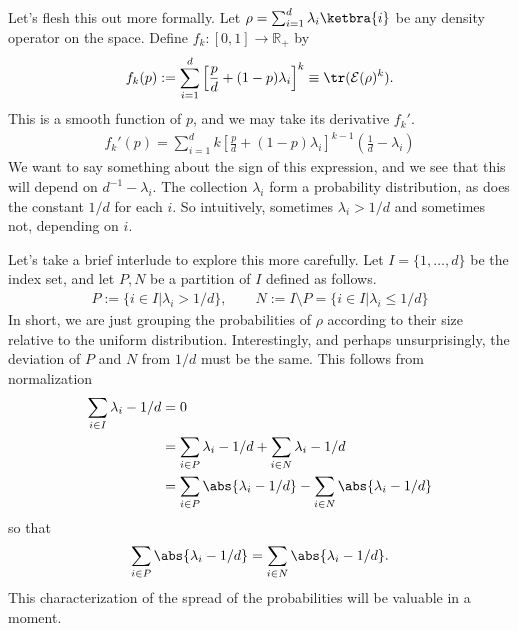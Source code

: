 \documentclass{book}
\begin{document}
    Let's flesh this out more formally. Let $\rho = \sum_{i=1}^d \lambda_i \ketbra{i}$ be any density operator on the space. Define $f_k:[0,1] \rightarrow \mathbb{R}_+$ by
    \begin{align}
        f_k(p) := \sum_{i=1}^d \left[\frac{p}{d} + (1-p) \lambda_i\right]^k \equiv \tr(\mathcal{E}(\rho)^k).
    \end{align}
    This is a smooth function of $p$, and we may take its derivative $f_k'$.
    \begin{align}\label{eq:8.18_deriv}
        f_k'(p) = \sum_{i=1}^d k \left[\frac{p}{d} + (1-p) \lambda_i\right]^{k-1} \left(\frac1d - \lambda_i\right)
    \end{align}
    We want to say something about the sign of this expression, and we see that this will depend on $d^{-1} - \lambda_i$. The collection $\lambda_i$ form a probability distribution, as does the constant $1/d$ for each $i$. So intuitively, sometimes $\lambda_i > 1/d$ and sometimes not, depending on $i$. 

    Let's take a brief interlude to explore this more carefully. Let $I = \{1, \dots, d\}$ be the index set, and let $P, N$ be a partition of $I$ defined as follows.
    \begin{align}
        P := \{i \in I \vert \lambda_i > 1/d\}, \qquad N := I \setminus P = \{i \in I \vert \lambda_i \leq 1/d\}
    \end{align}
    In short, we are just grouping the probabilities of $\rho$ according to their size relative to the uniform distribution. Interestingly, and perhaps unsurprisingly, the deviation of $P$ and $N$ from $1/d$ must be the same. This follows from normalization
    \begin{align}
    \begin{aligned}
        \sum_{i\in I} \lambda_i -1/d &= 0 \\
        &= \sum_{i\in P} \lambda_i -1/d + \sum_{i\in N} \lambda_i -1/d \\
        &= \sum_{i\in P} \abs{\lambda_i -1/d} - \sum_{i\in N} \abs{\lambda_i -1/d}
    \end{aligned}
    \end{align}
    so that
    \begin{align}
        \sum_{i\in P} \abs{\lambda_i -1/d} = \sum_{i\in N} \abs{\lambda_i -1/d}.
    \end{align}
    This characterization of the spread of the probabilities will be valuable in a moment.
\end{document}
